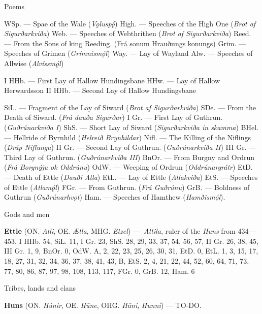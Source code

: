 Poems

WSp. — Spae of the Wale (\emph{Vǫluspǫ́})
High. — Speeches of the High One (\emph{Brot af Sigurðarkviða})
Web. — Speeches of Webthrithen (\emph{Brot af Sigurðarkviða})
Reed. — From the Sons of king Reeding. (Frá sonum Hrauðungs konungs)
Grim. — Speeches of Grimen (\emph{Grímnismǫ́l})
Way. — Lay of Wayland
Alw. — Speeches of Allwise (\emph{Alvíssmǫ́l})

I HHb. — First Lay of Hallow Hundingsbane
HHw. — Lay of Hallow Herwardsson
II HHb. — Second Lay of Hallow Hundingsbane

SiL. — Fragment of the Lay of Siward (\emph{Brot af Sigurðarkviða})
SDe. — From the Death of Siward. (\emph{Frá dauða Sigurðar})
I Gr. — First Lay of Guthrun. (\emph{Guðrúnarkviða I})
ShS. — Short Lay of Siward (\emph{Sigurðarkviða in skamma})
BHel. — Hellride of Byrnhild (\emph{Helreið Brynhildar})
Nifl. — The Killing of the Niflings (\emph{Dráp Niflunga})
II Gr. — Second Lay of Guthrun. (\emph{Guðrúnarkviða II})
III Gr. — Third Lay of Guthrun. (\emph{Guðrúnarkviða III})
BnOr. — From Burgny and Ordrun (\emph{Frá Borgnýju ok Oddrúnu})
OdW. — Weeping of Ordrun (\emph{Oddrúnargrátr})
EtD. — Death of Ettle (\emph{Dauði Atla})
EtL. — Lay of Ettle (\emph{Atlakviða})
EtS. — Speeches of Ettle (\emph{Atlamǫ́l})
FGr. — From Guthrun. (\emph{Frá Guðrúnu})
GrB. — Boldness of Guthrun (\emph{Guðrúnarhvǫt})
Ham. — Speeches of Hamthew (\emph{Hamðismǫ́l}).

Gods and men

\textbf{Ettle} (ON. \emph{Atli}, OE. \emph{Ætla}, MHG. \emph{Etzel}) — \emph{Attila}, ruler of the \emph{Huns} from 434—453.
 I HHb. 54, SiL. 11, I Gr. 23, ShS. 28, 29, 33, 37, 54, 56, 57, II Gr. 26, 38, 45, III Gr. 1, 9, BnOr. 0, OdW. A, 2, 22, 23, 25, 26, 30, 31, EtD. 0, EtL. 1, 3, 15, 17, 18, 27, 31, 32, 34, 36, 37, 38, 41, 43, B, EtS. 2, 4, 21, 22, 44, 52, 60, 64, 71, 73, 77, 80, 86, 87, 97, 98, 108, 113, 117, FGr. 0, GrB. 12, Ham. 6

Tribes, lands and clans

\textbf{Huns} (ON. \emph{Húnir}, OE. \emph{Hūne}, OHG. \emph{Hūni}, \emph{Hunni}) — TO-DO.
